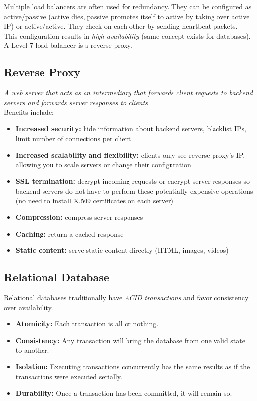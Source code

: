 \documentclass[12pt, titlepage]{article}
\begin{document}
Multiple load balancers are often used for redundancy. They can be configured as active/passive (active dies, passive promotes itself to active by taking over active IP) or active/active. They check on each other by sending heartbeat packets. This configuration results in \textit{high availability} (same concept exists for databases). \\

A Level 7 load balancer is a reverse proxy.

\subsection{Reverse Proxy}

\textit{A web server that acts as an intermediary that forwards client requests to backend servers and forwards server responses to clients} \\

Benefits include:
\begin{itemize}
  \item \textbf{Increased security:} hide information about backend servers, blacklist IPs, limit number of connections per client
  \item \textbf{Increased scalability and flexibility:} clients only see reverse proxy's IP, allowing you to scale servers or change their configuration
  \item \textbf{SSL termination:} decrypt incoming requests or encrypt server responses so backend servers do not have to perform these potentially expensive operations (no need to install X.509 certificates on each server)
  \item \textbf{Compression:} compress server responses
  \item \textbf{Caching:} return a cached response
  \item \textbf{Static content:} serve static content directly (HTML, images, videos)
\end{itemize}

\subsection{Relational Database}

Relational databases traditionally have \textit{ACID transactions} and favor consistency over availability. \\

\begin{itemize}
  \item \textbf{Atomicity:} Each transaction is all or nothing.
  \item \textbf{Consistency:} Any transaction will bring the database from one valid state to another.
  \item \textbf{Isolation:} Executing transactions concurrently has the same results as if the transactions were executed serially.
  \item \textbf{Durability:} Once a transaction has been committed, it will remain so.
\end{itemize}
\end{document}
